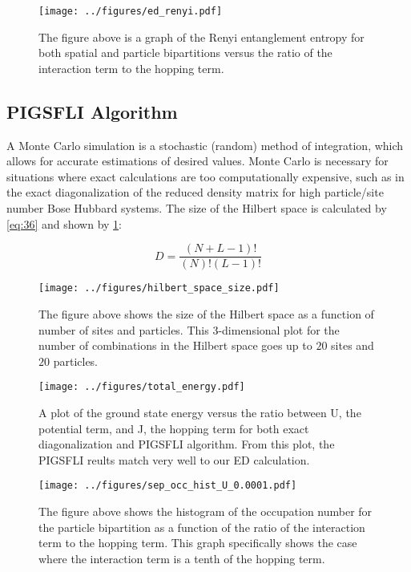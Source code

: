 
\begin{figure}[H]
\centering
\texttt{[image: ../figures/ed\_renyi.pdf]}
\caption{The figure above is a graph of the Renyi entanglement entropy for both spatial and particle bipartitions versus the ratio of the interaction term to the hopping term.}
\end{figure}

\subsection{PIGSFLI Algorithm} \label{PIGSFLI}

A Monte Carlo simulation is a stochastic (random) method of integration, which allows for accurate estimations of desired values. Monte Carlo is necessary for situations where exact calculations are too computationally expensive, such as in the exact diagonalization of the reduced density matrix for high particle/site number Bose Hubbard systems. The size of the Hilbert space is calculated by \cref{eq:36} and shown by \cref{fig:hilbert_space_size}:

\begin{equation}
D = \frac{\left(N+L-1\right)!}{\left(N\right)!\left(L-1\right)!}
\label{eq:36}
\end{equation}

\begin{figure}[H]
\centering
\texttt{[image: ../figures/hilbert\_space\_size.pdf]}
\caption{The figure above shows the size of the Hilbert space as a function of number of sites and particles. This 3-dimensional plot for the number of combinations in the Hilbert space goes up to $20$ sites and $20$ particles.}
\label{fig:hilbert_space_size}
\end{figure}


\begin{figure}[H]
\centering
\texttt{[image: ../figures/total\_energy.pdf]}
\caption{A plot of the ground state energy versus the ratio between U, the potential term, and J, the hopping term for both exact diagonalization and PIGSFLI algorithm. From this plot, the PIGSFLI reults match very well to our ED calculation.}
\label{fig:total_energy}
\end{figure}

\begin{figure}[H]
\centering
\texttt{[image: ../figures/sep\_occ\_hist\_U\_0.0001.pdf]}
\caption{The figure above shows the histogram of the occupation number for the particle bipartition as a function of the ratio of the interaction term to the hopping term. This graph specifically shows the case where the interaction term is a tenth of the hopping term.}
\label{fig:sep_occ_hist_U_0.0001}
\end{figure}

